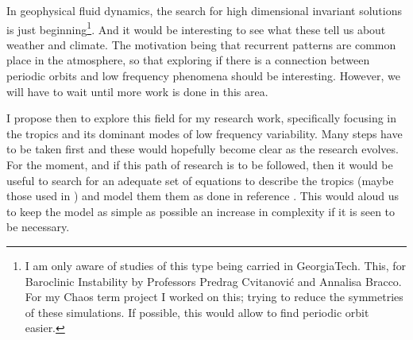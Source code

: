 \documentclass{article}%
\begin{document}
In geophysical fluid dynamics, the search for high dimensional invariant solutions is just beginning\footnote{
I am only aware of studies of this type being carried in GeorgiaTech. This, for Baroclinic Instability by Professors Predrag Cvitanovi{\'c} and Annalisa Bracco. For my Chaos term project I worked on this; trying to reduce the symmetries of these simulations. If possible, this would allow to find periodic orbit easier.
}. And it would be interesting to
see what these tell us about weather and climate. The motivation being that recurrent patterns are common place
in the atmosphere, so that exploring if there is a connection between periodic orbits and low frequency phenomena should be interesting. However, we will have to wait
until more work is done in this area.

I propose then to explore this field for my research work, specifically focusing in the tropics and its dominant modes of low frequency
variability. Many steps have to be taken first and these would hopefully become clear as the research evolves. For the moment, and if this path of research is to be followed, then it would be useful to search for an adequate set of equations to describe the tropics (maybe those used in \cite{Majda03}) and model them them as done in reference \cite{Webster72}. This would aloud us to keep the model as simple as possible an increase in complexity if it is seen to be necessary.



\end{document}
